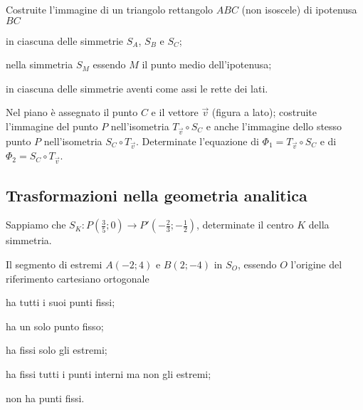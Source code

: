 \begin{esercizio}
\label{ese:8.96} %
Costruite l'immagine di un triangolo rettangolo \(ABC\) (non isoscele) 
di ipotenusa \(BC\)
\begin{enumeratea}
\item in ciascuna delle simmetrie \(S_A\), \(S_B\) e \(S_C\);
\item nella simmetria \(S_M\) essendo \(M\) il punto medio dell'ipotenusa;
\item in ciascuna delle simmetrie aventi come assi le rette dei lati.
\end{enumeratea}
\end{esercizio}

\begin{esercizio}
  \label{ese:8.63} %
  Nel piano è assegnato il punto \(C\) e il vettore \(\vec{v}\) (figura a 
  lato); costruite l'immagine del punto \(P\) nell'isometria \(T_{\vec{v}} 
  \circ S_{C}\) e anche l'immagine dello stesso punto \(P\) nell'isometria 
  \(S_{C} \circ T_{\vec{v}}\). Determinate l'equazione di \(\Phi_1 = 
  T_{\vec{v}} \circ S_{C}\) e di \(\Phi_2 = S_{C} \circ T_{\vec{v}}\).
\end{esercizio}


\subsection{Trasformazioni nella geometria analitica}

\begin{esercizio}
  \label{ese:8.7}
  Sappiamo che \(S_K:P\left(\frac{3}{5};0\right) \rightarrow 
  P'\left(-\frac{2}{3};-\frac{1}{2}\right)\), determinate il centro \(K\) 
  della simmetria. 
\end{esercizio}

\begin{esercizio}
  \label{ese:8.8}
  Il segmento di estremi \(A(-2;4)\) e \(B(2;-4)\) in \(S_O\), essendo \(O\) 
  l'origine del riferimento cartesiano ortogonale
  \begin{enumeratea}
    \item ha tutti i suoi punti fissi;
    \item ha un solo punto fisso;
    \item ha fissi solo gli estremi;
    \item ha fissi tutti i punti interni ma non gli estremi;
    \item non ha punti fissi.
  \end{enumeratea}
\end{esercizio}

